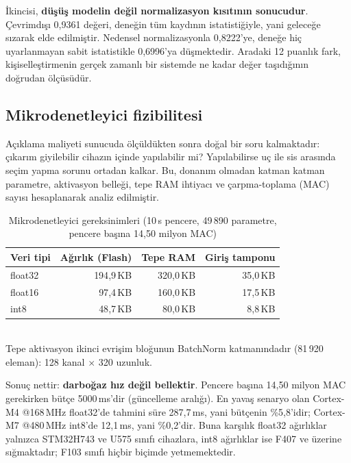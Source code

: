 \documentclass[conference]{IEEEtran}
\newcommand{\ms}{\,ms\xspace}
\begin{document}
İkincisi, \textbf{düşüş modelin değil normalizasyon kısıtının sonucudur}.
Çevrimdışı 0{,}9361 değeri, deneğin tüm kaydının istatistiğiyle, yani geleceğe
sızarak elde edilmiştir. Nedensel normalizasyonla 0{,}8222'ye, deneğe hiç
uyarlanmayan sabit istatistikle 0{,}6996'ya düşmektedir. Aradaki 12 puanlık fark,
kişiselleştirmenin gerçek zamanlı bir sistemde ne kadar değer taşıdığının
doğrudan ölçüsüdür.

\subsection{Mikrodenetleyici fizibilitesi}

Açıklama maliyeti sunucuda ölçüldükten sonra doğal bir soru kalmaktadır: çıkarım
giyilebilir cihazın içinde yapılabilir mi? Yapılabilirse uç ile sis arasında
seçim yapma sorunu ortadan kalkar. Bu, donanım olmadan katman katman parametre,
aktivasyon belleği, tepe RAM ihtiyacı ve çarpma-toplama (MAC) sayısı
hesaplanarak analiz edilmiştir.

\begin{table}[t]
\caption{Mikrodenetleyici gereksinimleri (10\,s pencere, 49\,890 parametre,
pencere başına 14{,}50 milyon MAC)}
\label{tab:mcu}
\centering
\small
\begin{tabular}{lrrr}
\toprule
\textbf{Veri tipi} & \textbf{Ağırlık (Flash)} & \textbf{Tepe RAM} & \textbf{Giriş tamponu}\\
\midrule
float32 & 194{,}9\,KB & 320{,}0\,KB & 35{,}0\,KB\\
float16 & 97{,}4\,KB  & 160{,}0\,KB & 17{,}5\,KB\\
int8    & 48{,}7\,KB  & 80{,}0\,KB  & 8{,}8\,KB\\
\bottomrule
\end{tabular}
\\[2pt]
\footnotesize Tepe aktivasyon ikinci evrişim bloğunun BatchNorm katmanındadır
(81\,920 eleman): 128 kanal $\times$ 320 uzunluk.
\end{table}

Sonuç nettir: \textbf{darboğaz hız değil bellektir}. Pencere başına 14{,}50
milyon MAC gerekirken bütçe 5000\ms'dir (güncelleme aralığı). En yavaş senaryo
olan Cortex-M4 @168\,MHz float32'de tahmini süre 287{,}7\ms, yani bütçenin
\%5{,}8'idir; Cortex-M7 @480\,MHz int8'de 12{,}1\ms, yani \%0{,}2'dir. Buna
karşılık float32 ağırlıklar yalnızca STM32H743 ve U575 sınıfı cihazlara,
int8 ağırlıklar ise F407 ve üzerine sığmaktadır; F103 sınıfı hiçbir biçimde
yetmemektedir.
\end{document}
